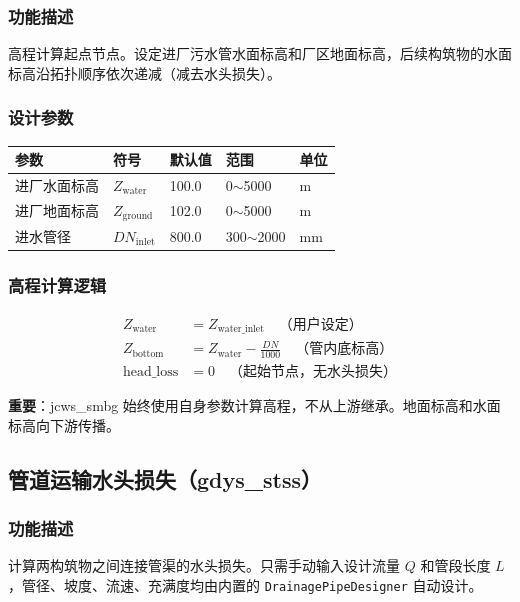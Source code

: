 \documentclass[12pt,a4paper]{ctexart}
\begin{document}
\subsubsection{功能描述}
高程计算起点节点。设定进厂污水管水面标高和厂区地面标高，后续构筑物的水面标高沿拓扑顺序依次递减（减去水头损失）。

\subsubsection{设计参数}
\begin{table}[h]
\centering
\begin{tabular}{@{}lllll@{}}
\toprule
参数 & 符号 & 默认值 & 范围 & 单位 \\
\midrule
进厂水面标高 & $Z_{\text{water}}$ & 100.0 & 0$\sim$5000 & m \\
进厂地面标高 & $Z_{\text{ground}}$ & 102.0 & 0$\sim$5000 & m \\
进水管径     & $DN_{\text{inlet}}$ & 800.0 & 300$\sim$2000 & mm \\
\bottomrule
\end{tabular}
\end{table}

\subsubsection{高程计算逻辑}

\begin{equation}
    \begin{aligned}
        Z_{\text{water}} &= Z_{\text{water\_inlet}} \quad \text{（用户设定）} \\
        Z_{\text{bottom}} &= Z_{\text{water}} - \frac{DN}{1000} \quad \text{（管内底标高）} \\
        \text{head\_loss} &= 0 \quad \text{（起始节点，无水头损失）}
    \end{aligned}
\end{equation}

\textbf{重要}：jcws\_smbg 始终使用自身参数计算高程，不从上游继承。地面标高和水面标高向下游传播。

\subsection{管道运输水头损失（gdys\_stss）}

\subsubsection{功能描述}
计算两构筑物之间连接管渠的水头损失。只需手动输入设计流量 $Q$ 和管段长度 $L$，管径、坡度、流速、充满度均由内置的 \texttt{DrainagePipeDesigner} 自动设计。
\end{document}
